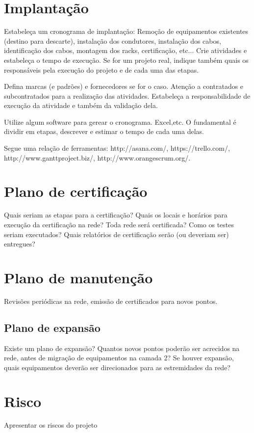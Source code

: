 \documentclass[	DIV=calc,%
							paper=a4,%
							fontsize=12pt,%
							onecolumn]{scrartcl}	 					%
\begin{document}
\section{Implantação}
Estabeleça um cronograma de implantação:
Remoção de equipamentos existentes (destino para descarte), instalação dos condutores, instalação dos cabos, 
identificação dos cabos, montagem dos racks, certificação, etc... Crie atividades e estabeleça o tempo de execução. Se for um projeto real, indique também quais os responsáveis pela execução do projeto e de cada uma das etapas.

Defina marcas (e padrões) e fornecedores se for o caso. Atenção a contratados e subcontratados para a realização das atividades. Estabeleça a responsabilidade de execução da atividade e também da validação dela.

Utilize algum software para gerear o cronograma. Excel,etc. O fundamental é dividir em etapas, descrever e estimar o tempo de cada uma delas.

Segue uma relação de ferramentas:
http://asana.com/, 
https://trello.com/, 
http://www.ganttproject.biz/, 
http://www.orangescrum.org/. 

\section{Plano de certificação}
Quais seriam as etapas para a certificação? 
Quais os locais e horários para execução da certificação na rede? Toda rede será certificada?
Como os testes seriam executados?
Quais relatórios de certificação serão (ou deveriam ser) entregues? 

\section{Plano de manutenção}

Revisões periódicas na rede, emissão de certificados para novos pontos.

\subsection{Plano de expansão}
Existe um plano de expansão? Quantos novos pontos poderão ser acrecidos na rede, antes de migração de equipamentos na camada 2? Se houver expansão, quais equipamentos deverão ser direcionados para as estremidades da rede? 

\section{Risco}
Apresentar os riscos do projeto
\end{document}
